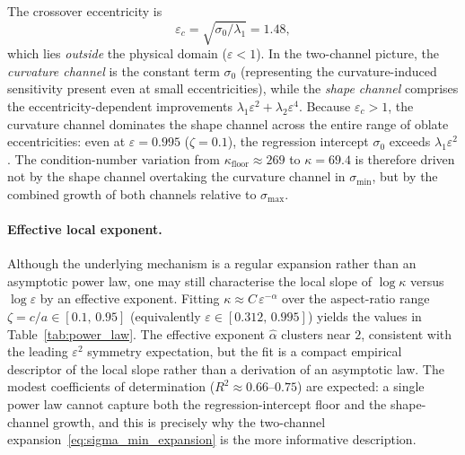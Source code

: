 The crossover eccentricity is
\begin{equation}\label{eq:crossover}
  \varepsilon_c = \sqrt{\sigma_0 / \lambda_1} = 1.48,
\end{equation}
which lies \emph{outside} the physical domain ($\varepsilon < 1$).  In the
two-channel picture, the \emph{curvature channel} is the constant term
$\sigma_0$ (representing the curvature-induced sensitivity present even at
small eccentricities), while the \emph{shape channel} comprises the
eccentricity-dependent improvements $\lambda_1\varepsilon^2 +
\lambda_2\varepsilon^4$.  Because $\varepsilon_c > 1$, the curvature channel
dominates the shape channel across the
entire range of oblate eccentricities: even at $\varepsilon = 0.995$
($\zeta = 0.1$), the regression intercept $\sigma_0$ exceeds
$\lambda_1\varepsilon^2$.  The condition-number variation from
$\kappa_\mathrm{floor} \approx 269$ to $\kappa = 69.4$ is therefore driven
not by the shape channel overtaking the curvature channel in
$\sigma_{\min}$, but by the combined growth of both channels relative to
$\sigma_{\max}$.

\paragraph{Effective local exponent.}
Although the underlying mechanism is a regular expansion rather than an
asymptotic power law, one may still characterise the local slope of
$\log\kappa$ versus $\log\varepsilon$ by an effective exponent.  Fitting
$\kappa \approx C\,\varepsilon^{-\alpha}$ over the aspect-ratio range
$\zeta = c/a \in [0.1,\,0.95]$ (equivalently
$\varepsilon\in[0.312,\,0.995]$) yields the values in
Table~\ref{tab:power_law}.  The effective exponent $\hat\alpha$ clusters
near $2$, consistent with the leading $\varepsilon^2$ symmetry expectation,
but the fit is a compact empirical descriptor of the local slope rather
than a derivation of an asymptotic law.
The modest coefficients of determination ($R^2 \approx 0.66$--$0.75$) are
expected: a single power law cannot capture both the regression-intercept floor
and the shape-channel growth, and this is precisely why the two-channel
expansion~\eqref{eq:sigma_min_expansion} is the more informative
description.

